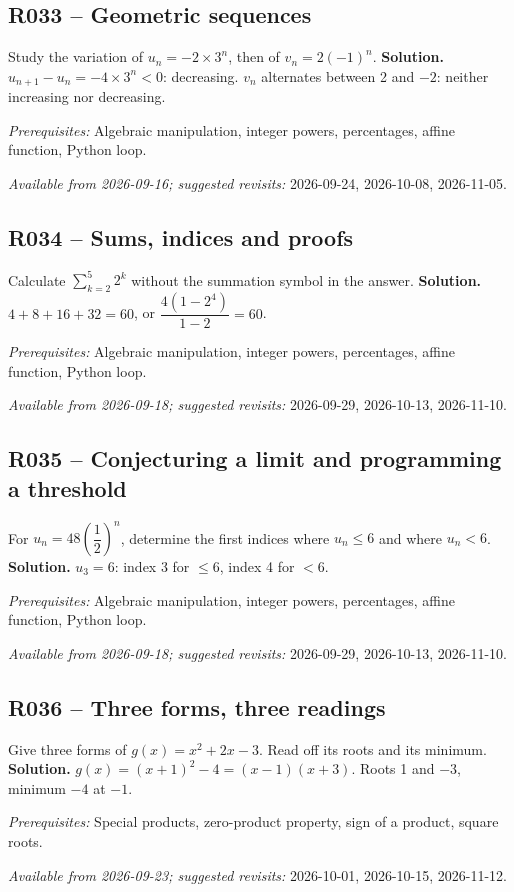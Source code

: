 \subsection*{R033 -- Geometric sequences}\label{R033}
Study the variation of $u_n=-2\times3^n$, then of $v_n=2(-1)^n$.
\ifprof\textbf{Solution.} $u_{n+1}-u_n=-4\times3^n<0$: decreasing. $v_n$ alternates between 2 and $-2$: neither increasing nor decreasing.\par\textit{Prerequisites:} Algebraic manipulation, integer powers, percentages, affine function, Python loop.\par\textit{Available from 2026-09-16; suggested revisits:} 2026-09-24, 2026-10-08, 2026-11-05.\fi
{}\subsection*{R034 -- Sums, indices and proofs}\label{R034}
Calculate $\sum_{k=2}^{5}2^k$ without the summation symbol in the answer.
\ifprof\textbf{Solution.} $4+8+16+32=60$, or $\dfrac{4(1-2^4)}{1-2}=60$.\par\textit{Prerequisites:} Algebraic manipulation, integer powers, percentages, affine function, Python loop.\par\textit{Available from 2026-09-18; suggested revisits:} 2026-09-29, 2026-10-13, 2026-11-10.\fi
{}\subsection*{R035 -- Conjecturing a limit and programming a threshold}\label{R035}
For $u_n=48(\dfrac{1}{2})^n$, determine the first indices where $u_n\leq6$ and where $u_n<6$.
\ifprof\textbf{Solution.} $u_3=6$: index 3 for $\leq6$, index 4 for $<6$.\par\textit{Prerequisites:} Algebraic manipulation, integer powers, percentages, affine function, Python loop.\par\textit{Available from 2026-09-18; suggested revisits:} 2026-09-29, 2026-10-13, 2026-11-10.\fi
{}\subsection*{R036 -- Three forms, three readings}\label{R036}
Give three forms of $g(x)=x^2+2x-3$. Read off its roots and its minimum.
\ifprof\textbf{Solution.} $g(x)=(x+1)^2-4=(x-1)(x+3)$. Roots 1 and $-3$, minimum $-4$ at $-1$.\par\textit{Prerequisites:} Special products, zero-product property, sign of a product, square roots.\par\textit{Available from 2026-09-23; suggested revisits:} 2026-10-01, 2026-10-15, 2026-11-12.\fi
